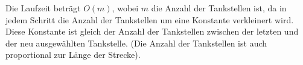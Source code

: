 \documentclass[a4paper,10pt]{scrartcl}
\begin{document}
Die Laufzeit beträgt $O(m)$, wobei $m$ die Anzahl der Tankstellen ist,
da in jedem Schritt die Anzahl der Tankstellen um eine Konstante
verkleinert wird. Diese Konstante ist gleich der Anzahl der Tankstellen
zwischen der letzten und der neu ausgewählten Tankstelle. (Die Anzahl der Tankstellen ist auch proportional zur Länge der Strecke).
\end{document}
